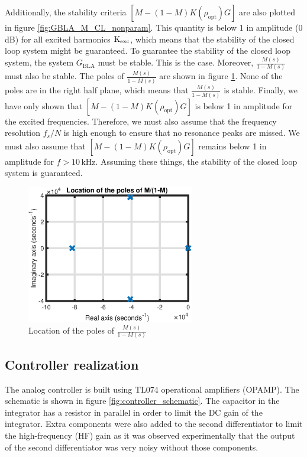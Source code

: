 Additionally, the stability criteria $[M - (1-M)K(\rho_{\mathrm{opt}})G]$ are also plotted in figure \ref{fig:GBLA_M_CL_nonparam}. This quantity is below 1 in amplitude (0 dB) for all excited harmonics $\text{K}_{\text{exc}}$, which means that the stability of the closed loop system might be guaranteed. To guarantee the stability of the closed loop system, the system $G_{\mathrm{BLA}}$ must be stable. This is the case. Moreover, $\frac{M(s)}{1-M(s)}$ must also be stable. The poles of $\frac{M(s)}{1-M(s)}$ are shown in figure \ref{fig:M_one_minus_M_poles}. None of the poles are in the right half plane, which means that $\frac{M(s)}{1-M(s)}$ is stable. Finally, we have only shown that $[M - (1-M)K(\rho_{\mathrm{opt}})G]$ is below 1 in amplitude for the excited frequencies. Therefore, we must also assume that the frequency resolution $f_s/N$ is high enough to ensure that no resonance peaks are missed. We must also assume that $[M - (1-M)K(\rho_{\mathrm{opt}})G]$ remains below 1 in amplitude for $f > 10 \, \mathrm{kHz}$. Assuming these things, the stability of the closed loop system is guaranteed.

\begin{figure}[H]
\centering
\includegraphics[width = 0.65\textwidth]{figures/M_one_minus_M_poles.eps}
\caption{Location of the poles of $\frac{M(s)}{1-M(s)}$}
\label{fig:M_one_minus_M_poles}
\end{figure}

\subsection{Controller realization}
The analog controller is built using TL074 operational amplifiers (OPAMP). The schematic is shown in figure \ref{fig:controller_schematic}. The capacitor in the integrator has a resistor
in parallel in order to limit the DC gain of the integrator. Extra components were also added to the second differentiator to limit the high-frequency (HF) gain as it was observed experimentally that the output of the second differentiator was very noisy without those components.

